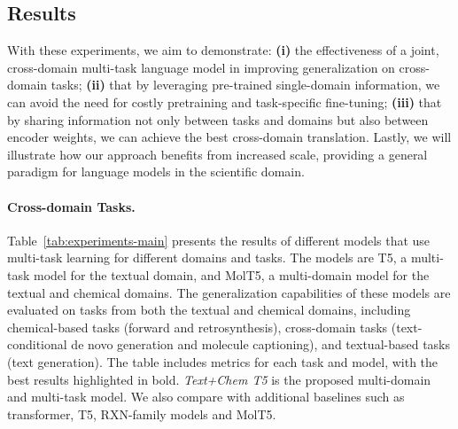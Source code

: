 \documentclass[nohyperref]{article}
\theoremstyle{plain}
\theoremstyle{definition}
\theoremstyle{remark}
\begin{document}
\subsection{Results} 
With these experiments, we aim to demonstrate: 
\textbf{(i)} the effectiveness of a joint, cross-domain multi-task language model in improving generalization on cross-domain tasks; 
\textbf{(ii)} that by leveraging pre-trained single-domain information, we can avoid the need for costly pretraining and task-specific fine-tuning; 
\textbf{(iii)} that by sharing information not only between tasks and domains but also between encoder weights, we can achieve the best cross-domain translation. Lastly, we will illustrate how our approach benefits from increased scale, providing a general paradigm for language models in the scientific domain.

\paragraph{Cross-domain Tasks.}
Table~\ref{tab:experiments-main} presents the results of different models that use multi-task learning for different domains and tasks. The models are T5, a multi-task model for the textual domain, and MolT5, a multi-domain model for the textual and chemical domains. 
The generalization capabilities of these models are evaluated on tasks from both the textual and chemical domains, including chemical-based tasks (forward and retrosynthesis), cross-domain tasks (text-conditional de novo generation and molecule captioning), and textual-based tasks (text generation). The table includes metrics for each task and model, with the best results highlighted in bold. \textit{Text+Chem T5} is the proposed multi-domain and multi-task model.
We also compare with additional baselines such as transformer, T5, RXN-family models and MolT5.
\end{document}
